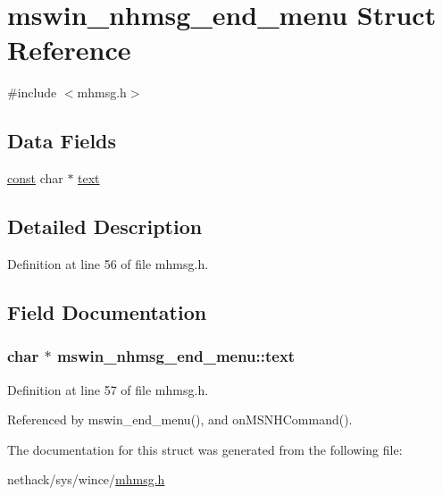 \hypertarget{structmswin__nhmsg__end__menu}{\section{mswin\+\_\+nhmsg\+\_\+end\+\_\+menu Struct Reference}
\label{structmswin__nhmsg__end__menu}
}


{\ttfamily \#include $<$mhmsg.\+h$>$}

\subsection*{Data Fields}
\begin{DoxyCompactItemize}
\item 
\hyperlink{tradstdc_8h_a2c212835823e3c54a8ab6d95c652660e}{const} char $\ast$ \hyperlink{structmswin__nhmsg__end__menu_ad09bb3853bacd831228b72ab2bd9e4eb}{text}
\end{DoxyCompactItemize}


\subsection{Detailed Description}


Definition at line 56 of file mhmsg.\+h.



\subsection{Field Documentation}
\hypertarget{structmswin__nhmsg__end__menu_ad09bb3853bacd831228b72ab2bd9e4eb}{
\subsubsection[{text}]{ char $\ast$ mswin\+\_\+nhmsg\+\_\+end\+\_\+menu\+::text}}\label{structmswin__nhmsg__end__menu_ad09bb3853bacd831228b72ab2bd9e4eb}


Definition at line 57 of file mhmsg.\+h.



Referenced by mswin\+\_\+end\+\_\+menu(), and on\+M\+S\+N\+H\+Command().



The documentation for this struct was generated from the following file\+:\begin{DoxyCompactItemize}
\item 
nethack/sys/wince/\hyperlink{sys_2wince_2mhmsg_8h}{mhmsg.\+h}\end{DoxyCompactItemize}
